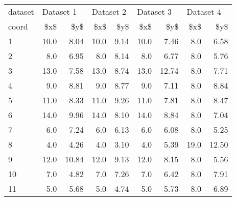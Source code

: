 \begin{tabular}{lrrrrrrrr}
\toprule
dataset & \multicolumn{2}{l}{Dataset 1} & \multicolumn{2}{l}{Dataset 2} & \multicolumn{2}{l}{Dataset 3} & \multicolumn{2}{l}{Dataset 4} \\
coord &       \$x\$ &    \$y\$ &       \$x\$ &   \$y\$ &       \$x\$ &    \$y\$ &       \$x\$ &    \$y\$ \\
\midrule
1  &      10.0 &   8.04 &      10.0 &  9.14 &      10.0 &   7.46 &       8.0 &   6.58 \\
2  &       8.0 &   6.95 &       8.0 &  8.14 &       8.0 &   6.77 &       8.0 &   5.76 \\
3  &      13.0 &   7.58 &      13.0 &  8.74 &      13.0 &  12.74 &       8.0 &   7.71 \\
4  &       9.0 &   8.81 &       9.0 &  8.77 &       9.0 &   7.11 &       8.0 &   8.84 \\
5  &      11.0 &   8.33 &      11.0 &  9.26 &      11.0 &   7.81 &       8.0 &   8.47 \\
6  &      14.0 &   9.96 &      14.0 &  8.10 &      14.0 &   8.84 &       8.0 &   7.04 \\
7  &       6.0 &   7.24 &       6.0 &  6.13 &       6.0 &   6.08 &       8.0 &   5.25 \\
8  &       4.0 &   4.26 &       4.0 &  3.10 &       4.0 &   5.39 &      19.0 &  12.50 \\
9  &      12.0 &  10.84 &      12.0 &  9.13 &      12.0 &   8.15 &       8.0 &   5.56 \\
10 &       7.0 &   4.82 &       7.0 &  7.26 &       7.0 &   6.42 &       8.0 &   7.91 \\
11 &       5.0 &   5.68 &       5.0 &  4.74 &       5.0 &   5.73 &       8.0 &   6.89 \\
\bottomrule
\end{tabular}
